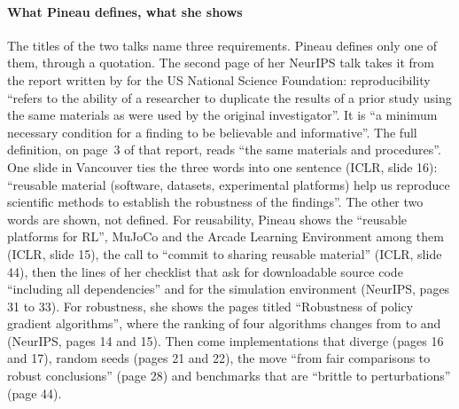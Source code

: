 \paragraph{What Pineau defines, what she shows}
The titles of the two talks name three requirements. Pineau defines only one of them, through a
quotation. The second page of her NeurIPS talk takes it from the report written by
\textcite{bollen2015robust} for the US National Science Foundation: reproducibility \enquote{refers to the
ability of a researcher to duplicate the results of a prior study\textellipsis{} using the same materials as were used
by the original investigator}. It is \enquote{a minimum necessary condition for a finding to be
believable and informative}. The full definition, on page~3 of that report, reads \enquote{the same
materials and procedures}. One slide in Vancouver ties the three words into one sentence (ICLR,
slide 16): \enquote{reusable material (software, datasets, experimental platforms) help us reproduce
scientific methods to establish the robustness of the findings}. The other two words are shown, not
defined. For reusability, Pineau shows the \enquote{reusable platforms for RL}, MuJoCo and the Arcade Learning
Environment among them (ICLR, slide 15), the call to \enquote{commit to sharing reusable material} (ICLR,
slide 44), then the lines of her checklist that ask for downloadable source code \enquote{including all
dependencies} and for the simulation environment (NeurIPS, pages 31 to 33). For robustness, she shows
the pages titled \enquote{Robustness of policy gradient algorithms}, where the ranking of four algorithms changes
from  to  and  (NeurIPS, pages 14 and 15). Then come
implementations that diverge (pages 16 and 17), random seeds (pages 21 and 22), the move \enquote{from
fair comparisons\textellipsis{} to robust conclusions} (page 28) and benchmarks that are \enquote{brittle to
perturbations} (page 44).

